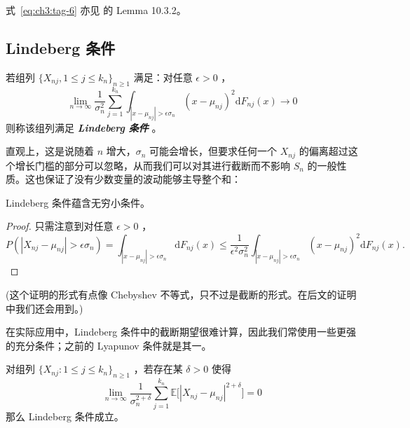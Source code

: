 \begin{remark}
式~\eqref{eq:ch3:tag-6} 亦见 \cite{athreya2006} 的 Lemma 10.3.2。
\end{remark}

\subsection{Lindeberg 条件}

\begin{definition*}[Lindeberg 条件]

若组列 $\{X_{nj}, 1 \leq j \leq k_n\}_{n \geq 1}$ 满足：对任意 $\epsilon >0$ ，
\[\lim_{n\to\infty}\frac1{\sigma_n^2}\sum_{j=1}^{k_n}\int_{|x-\mu_{nj}|>\epsilon\sigma_n}(x-\mu_{nj})^2\mathrm{d}F_{nj}(x)\to 0\]
则称该组列满足 \textbf{\emph{Lindeberg 条件}} 。

\end{definition*}

直观上，这是说随着 $n$ 增大，$\sigma_n$ 可能会增长，但要求任何一个 $X_{nj}$ 的偏离超过这个增长门槛的部分可以忽略，从而我们可以对其进行截断而不影响 $S_n$ 的一般性质。这也保证了没有少数变量的波动能够主导整个和：

\begin{lemma}

\label{lem:ch3:3-9}

Lindeberg 条件蕴含无穷小条件。

\end{lemma}

\begin{proof}

只需注意到对任意 $\epsilon >0$ ，
\[
P(|X_{nj} - \mu_{nj}|>\epsilon\sigma_n)= \int_{|x - \mu_{nj}| > \epsilon \sigma_n}\mathrm{d}F_{nj}(x) \le \frac1{\epsilon^2\sigma_n^2}\int_{|x - \mu_{nj}| > \epsilon \sigma_n}(x-\mu_{nj})^2\mathrm{d}F_{nj}(x).
\]

\end{proof}

(这个证明的形式有点像 Chebyshev 不等式，只不过是截断的形式。在后文的证明中我们还会用到。)

在实际应用中，Lindeberg 条件中的截断期望很难计算，因此我们常使用一些更强的充分条件；之前的 Lyapunov 条件就是其一。

\begin{lemma}

\label{lem:ch3:3-10}

对组列 $\{X_{nj}:1\le j\le k_n\}_{n\ge 1}$ ，若存在某 $\delta>0$ 使得
\[\lim_{n\to\infty}\frac1{\sigma_n^{2+\delta}}\sum_{j=1}^{k_n}\mathbb{E}\Big[|X_{nj}-\mu_{nj}|^{2+\delta}\Big]=0\]
那么 Lindeberg 条件成立。

\end{lemma}

